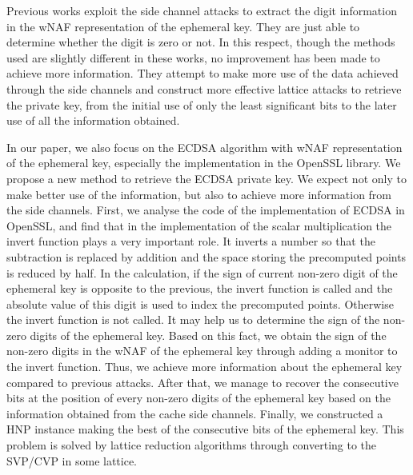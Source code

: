 

Previous works exploit the side channel attacks to extract the digit information in the wNAF representation of the ephemeral key.
They are just able to determine whether the digit is zero or not.
In this respect, though the methods used are slightly different in these works, no improvement has been made to achieve more information.
They attempt to make more use of the data achieved through the side channels and construct more effective lattice attacks to retrieve the private key,
 from the initial use of only the least significant bits to the later use of all the information obtained.

In our paper, we also focus on the ECDSA algorithm with wNAF representation of the ephemeral key, especially the implementation in the OpenSSL library.
 We propose a new method to retrieve the ECDSA private key.
We expect not only to make better use of the information,
  but also to achieve more information from the side channels.
First, we analyse the code of the implementation of ECDSA in OpenSSL,
 and find that
in the implementation of the scalar multiplication the invert function plays a very important role.
It inverts a number so that the subtraction is replaced by addition and the space storing the precomputed points is reduced by half.
In the calculation, if the sign of current non-zero digit of the ephemeral key is opposite to the previous, the invert function is called  and the absolute value of this digit is used to index the precomputed points. Otherwise the invert function is not called.
It may help us to determine the sign of the non-zero digits of the ephemeral key.
  Based on this fact, we obtain the sign of the non-zero digits in the wNAF of the ephemeral key through adding a monitor to the invert function.
 Thus, we achieve more information about the ephemeral key compared to previous attacks.
After that, we manage to recover the consecutive bits at the position of every non-zero digits of the ephemeral key based on the information obtained from the cache side channels.
Finally, we constructed a HNP \cite{boneh1996} instance making the best of the consecutive bits of the ephemeral key.
This problem is solved by lattice reduction algorithms  through converting to the SVP/CVP in some lattice.

